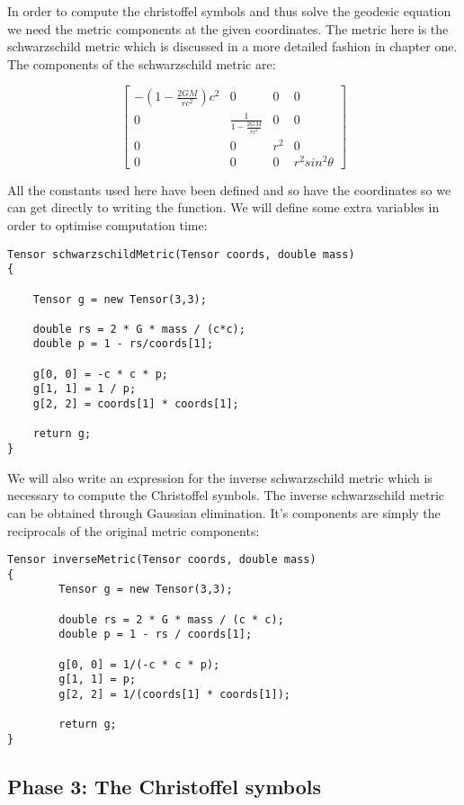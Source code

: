 \documentclass{article}
\begin{document}
In order to compute the christoffel symbols and thus solve the geodesic equation we need the metric components at the given coordinates. The metric here is the schwarzschild metric which is discussed in a more detailed fashion in chapter one. The components of the schwarzschild metric are:

\begin{equation*}
  \begin{bmatrix}
    -(1-\frac{2GM}{rc^2})c^2 & 0 & 0 & 0\\
    0 & \frac{1}{1-\frac{2GM}{rc^2}} & 0 & 0\\
    0 & 0 & r^2 & 0\\
    0 & 0 & 0 & r^2 sin^2 \theta
  \end{bmatrix}
\end{equation*}

All the constants used here have been defined and so have the coordinates so we can get directly to writing the function. We will define some extra variables in order to optimise computation time:

\begin{verbatim}
Tensor schwarzschildMetric(Tensor coords, double mass)
{

    Tensor g = new Tensor(3,3);

    double rs = 2 * G * mass / (c*c);  
    double p = 1 - rs/coords[1];

    g[0, 0] = -c * c * p;
    g[1, 1] = 1 / p;
    g[2, 2] = coords[1] * coords[1];

    return g;
}
\end{verbatim}

\newpage
We will also write an expression for the inverse schwarzschild metric which is necessary to compute the Christoffel symbols. The inverse schwarzschild metric can be obtained through Gaussian elimination. It's components are simply the reciprocals of the original metric components:

\begin{verbatim}
Tensor inverseMetric(Tensor coords, double mass)
{
        Tensor g = new Tensor(3,3);

        double rs = 2 * G * mass / (c * c);
        double p = 1 - rs / coords[1];

        g[0, 0] = 1/(-c * c * p);
        g[1, 1] = p;
        g[2, 2] = 1/(coords[1] * coords[1]);

        return g;
}
\end{verbatim}

\subsection{Phase 3: The Christoffel symbols}
\end{document}
